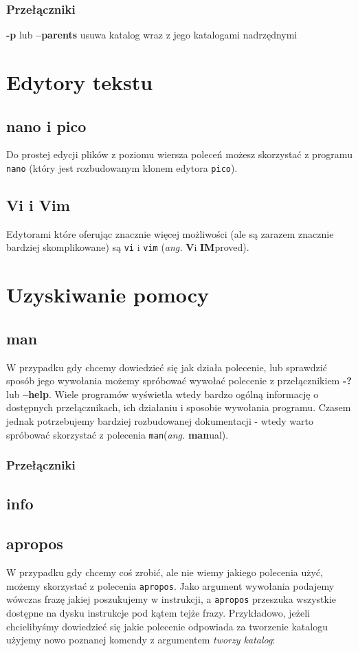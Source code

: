\subsubsection*{Przełączniki}
\begin{description}
\item \textbf{-p} lub \textbf{--parents} usuwa katalog wraz z jego katalogami nadrzędnymi
\end{description}

\section{Edytory tekstu}
\subsection{nano i pico}
Do prostej edycji plików z poziomu wiersza poleceń możesz skorzystać z programu \texttt{nano} (który jest rozbudowanym klonem edytora \texttt{pico}).
\subsection{Vi i Vim}
Edytorami które oferując znacznie więcej możliwości (ale są zarazem znacznie bardziej skomplikowane) są \texttt{vi} i \texttt{vim} (\textit{ang.} \textbf{V}i \textbf{IM}proved).

\section{Uzyskiwanie pomocy}
\subsection{man}
W przypadku gdy chcemy dowiedzieć się jak działa polecenie, lub sprawdzić sposób jego wywołania możemy spróbować wywołać polecenie z przełącznikiem \textbf{-?} lub \textbf{--help}. Wiele programów wyświetla wtedy bardzo ogólną informację o dostępnych przełącznikach, ich działaniu i sposobie wywołania programu. Czasem jednak potrzebujemy bardziej rozbudowanej dokumentacji - wtedy warto spróbować skorzystać z polecenia \texttt{man}(\textit{ang.} \textbf{man}ual).
\subsubsection*{Przełączniki}
\subsection{info}
\subsection{apropos}
W przypadku gdy chcemy coś zrobić, ale nie wiemy jakiego polecenia użyć, możemy skorzystać z polecenia \texttt{apropos}. Jako argument wywołania podajemy wówczas frazę jakiej poszukujemy w instrukcji, a \texttt{apropos} przeszuka wszystkie dostępne na dysku instrukcje pod kątem tejże frazy. Przykładowo, jeżeli chcielibyśmy dowiedzieć się jakie polecenie odpowiada za tworzenie katalogu  użyjemy nowo poznanej komendy z argumentem \textit{tworzy katalog}:
\newline
